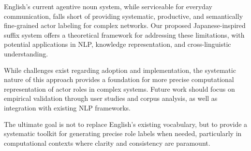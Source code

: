 \documentclass[11pt]{article}
\begin{document}
English's current agentive noun system, while serviceable for everyday communication, falls short of providing systematic, productive, and semantically fine-grained actor labeling for complex networks. Our proposed Japanese-inspired suffix system offers a theoretical framework for addressing these limitations, with potential applications in NLP, knowledge representation, and cross-linguistic understanding.

While challenges exist regarding adoption and implementation, the systematic nature of this approach provides a foundation for more precise computational representation of actor roles in complex systems. Future work should focus on empirical validation through user studies and corpus analysis, as well as integration with existing NLP frameworks.

The ultimate goal is not to replace English's existing vocabulary, but to provide a systematic toolkit for generating precise role labels when needed, particularly in computational contexts where clarity and consistency are paramount.
\end{document}

